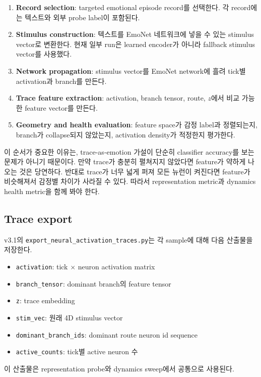 \documentclass[11pt,a4paper]{article}
\begin{document}
\begin{enumerate}
  \item \textbf{Record selection}: targeted emotional episode record를 선택한다. 각 record에는 텍스트와 외부 probe label이 포함된다.
  \item \textbf{Stimulus construction}: 텍스트를 EmoNet 네트워크에 넣을 수 있는 stimulus vector로 변환한다. 현재 일부 run은 learned encoder가 아니라 fallback stimulus vector를 사용했다.
  \item \textbf{Network propagation}: stimulus vector를 EmoNet network에 흘려 tick별 activation과 branch를 만든다.
  \item \textbf{Trace feature extraction}: activation, branch tensor, route, \(z\)에서 비교 가능한 feature vector를 만든다.
  \item \textbf{Geometry and health evaluation}: feature space가 감정 label과 정렬되는지, branch가 collapse되지 않았는지, activation density가 적정한지 평가한다.
\end{enumerate}

이 순서가 중요한 이유는, trace-as-emotion 가설이 단순히 classifier accuracy를 보는 문제가 아니기 때문이다. 만약 trace가 충분히 펼쳐지지 않았다면 feature가 약하게 나오는 것은 당연하다. 반대로 trace가 너무 넓게 퍼져 모든 뉴런이 켜진다면 feature가 비슷해져서 감정별 차이가 사라질 수 있다. 따라서 representation metric과 dynamics health metric을 함께 봐야 한다.

\subsection{Trace export}

v3.1의 \texttt{export\_neural\_activation\_traces.py}는 각 sample에 대해 다음 산출물을 저장한다.

\begin{itemize}
  \item \texttt{activation}: tick \(\times\) neuron activation matrix
  \item \texttt{branch\_tensor}: dominant branch의 feature tensor
  \item \texttt{z}: trace embedding
  \item \texttt{stim\_vec}: 원래 4D stimulus vector
  \item \texttt{dominant\_branch\_ids}: dominant route neuron id sequence
  \item \texttt{active\_counts}: tick별 active neuron 수
\end{itemize}

이 산출물은 representation probe와 dynamics sweep에서 공통으로 사용된다.
\end{document}
